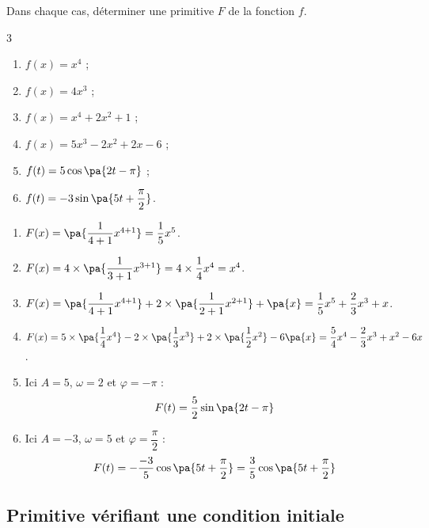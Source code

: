 \begin{methode}
	Dans chaque cas, déterminer une primitive $F$ de la fonction $f$.

	\begin{multicols}{3}
		\begin{enumerate}
			\item $f(x) = x^4$ ;
			\item $f(x) = 4x^3$ ;
			\item $f(x) = x^4 + 2x^2 + 1$ ;
			\item $f(x) = 5x^3 - 2x^2 + 2x - 6$ ;
			\item $f(t) = 5\cos\pa{2t - \pi}$ ;
			\item $f(t) = -3\sin\pa{5t + \dfrac{\pi}{2}}$.
		\end{enumerate}
	\end{multicols}

	\begin{correction}
		\nline
		\begin{enumerate}
			\item $F(x) = \pa{\dfrac{1}{4 + 1}x^{4+1}} = \dfrac{1}{5}x^5$.
			\item $F(x) = 4 \times \pa{\dfrac{1}{3 + 1}x^{3+1}} = 4 \times \dfrac{1}{4}x^4 = x^4$.
			\item $F(x) = \pa{\dfrac{1}{4 + 1}x^{4+1}} + 2\times \pa{\dfrac{1}{2 + 1}x^{2+1}} + \pa{x} = \dfrac{1}{5}x^5 + \dfrac{2}{3}x^3 + x$.
			\item $F(x) = 5 \times \pa{\dfrac{1}{4}x^4} - 2 \times \pa{\dfrac{1}{3}x^3} + 2 \times \pa{\dfrac{1}{2}x^2} - 6\pa{x} = \dfrac{5}{4}x^4 - \dfrac{2}{3}x^3 + x^2 - 6x$.
			\item Ici $A = 5$, $\omega = 2$ et $\varphi = -\pi$ :
			      \[
				      F(t) = \dfrac{5}{2}\sin\pa{2t - \pi}
			      \]

			\item Ici $A = -3$, $\omega = 5$ et $\varphi = \dfrac{\pi}{2}$ :
			      \[
				      F(t) = -\dfrac{-3}{5}\cos\pa{5t + \dfrac{\pi}{2}} = \dfrac{3}{5}\cos\pa{5t + \dfrac{\pi}{2}}
			      \]

		\end{enumerate}
	\end{correction}
\end{methode}

\subsection{Primitive vérifiant une condition initiale}

